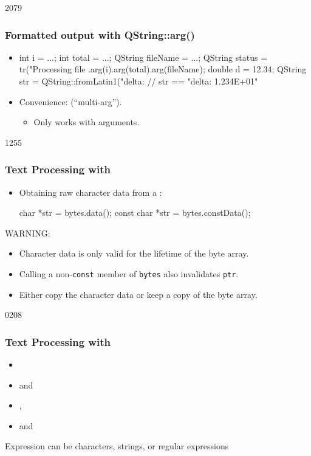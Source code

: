 \begin{slide}[fragile]{2079}
\frametitle{Formatted output with QString::arg()}
\begin{itemize}
\item[]
\begin{cpp}
int i = ...;
int total = ...;
QString fileName = ...;
QString status = tr("Processing file %
                .arg(i).arg(total).arg(fileName);
double d = 12.34;
QString str = QString::fromLatin1("delta: %
// str == "delta: 1.234E+01"               
\end{cpp}\medskip

\item Convenience:  (``multi-arg'').
  \begin{itemize}
  \item Only works with  arguments.
  \end{itemize}
\end{itemize}
\end{slide}

\begin{slide}[fragile]{1255}\frametitle{Text Processing with }
  \begin{itemize}
  \item Obtaining raw character data from a :
  
  \begin{cpp}
char *str = bytes.data();
const char *str = bytes.constData();
  \end{cpp}
  \end{itemize}\bigskip

WARNING:
  \begin{itemize}  
  \item Character data is only valid for the lifetime of the byte array.
  \item Calling a non-\texttt{const} member of \texttt{bytes} also invalidates \texttt{ptr}.
  \item Either copy the character data or keep a copy of the byte array.
  \end{itemize}
\end{slide}

\begin{slide}{0208}\frametitle{Text Processing with }
    \begin{itemize}
      \item {} 
      \item {} and  
      \item {}, 
      \item {} and  
    \end{itemize}
    Expression can be characters, strings, or regular expressions
\end{slide}

